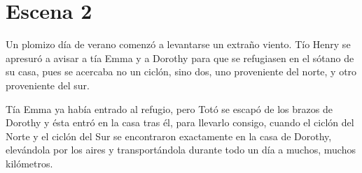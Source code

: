 \chapter{Escena 2}

Un plomizo día de verano comenzó a levantarse un extraño viento. Tío Henry se apresuró a avisar a tía Emma y a Dorothy para que se refugiasen en el sótano de su casa, pues se acercaba no un ciclón, sino dos, uno proveniente del norte, y otro proveniente del sur. 

Tía Emma ya había entrado al refugio, pero Totó se escapó de los brazos de Dorothy y ésta entró en la casa tras él, para llevarlo consigo, cuando el ciclón del Norte y el ciclón del Sur se encontraron exactamente en la casa de Dorothy, elevándola por los aires y transportándola durante todo un día a muchos, muchos kilómetros.